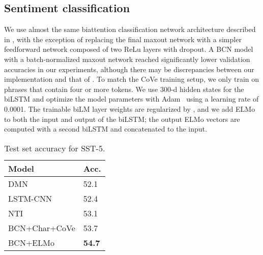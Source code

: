 \documentclass[11pt,a4paper]{article}
\newcommand{\ELMO}{ELMo}
\begin{document}
\subsection{Sentiment classification}
We use almost the same biattention classification network architecture described in \citet{McCann2017LearnedIT}, with the exception of replacing the final maxout network with a simpler feedforward network composed of two ReLu layers with dropout. A BCN model with a batch-normalized maxout network reached significantly lower validation accuracies in our experiments, although there may be discrepancies between our implementation and that of \citet{McCann2017LearnedIT}. To match the CoVe training setup, we only train on phrases that contain four or more tokens. We use 300-d hidden states for the biLSTM and optimize the model parameters with Adam~\cite{Kingma2014AdamAM} using a learning rate of 0.0001. The trainable biLM layer weights are regularized by , and we add ELMo to both the input and output of the biLSTM; the output ELMo vectors are computed with a second biLSTM and concatenated to the input. 

\begin{table}
\centering
\begin{tabular}{l|l}
\textbf{Model}                                & \textbf{Acc.} \\ \hline \hline
DMN \citep{kumar2015ask} & 52.1 \\
LSTM-CNN \citep{zhou2016text} & 52.4 \\
NTI \citep{munkhdalaineural} & 53.1 \\
BCN+Char+CoVe \citep{McCann2017LearnedIT} & 53.7 \\
BCN+\ELMO   & \textbf{54.7}
\end{tabular}
\caption{Test set accuracy for SST-5.
}
\label{table:sst_test}
\end{table}
\end{document}
